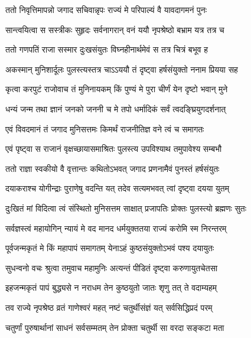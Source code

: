 \twolineshloka
{ततो निवृत्तिमापन्नो जगाद सचिवान्नृपः}
{राज्यं मे परिपाल्यं वै यावदागमनं पुनः} %

\twolineshloka
{सान्त्वयित्वा स सस्त्रीकः सुहृदः सर्वनागरान्}
{वनं ययौ नृपश्रेष्ठो बभ्राम यत्र तत्र च} %

\twolineshloka
{ततो गणपतिं राजा सस्मार दुःखसंयुतः}
{विघ्नहीनार्थमेवं स तत्र चित्रं बभूव ह} %

\twolineshloka
{अकस्मान् मुनिशार्दूलः पुलस्त्यस्तत्र चाऽऽययौ}
{तं दृष्ट्वा हर्षसंयुक्तो ननाम प्रियया सह} %

\twolineshloka
{कृत्वा करपुटं राजोवाच तं मुनिनायकम्}
{किं पुण्यं मे पुरा चीर्णं येन दृष्टो भवान् मुने} %

\twolineshloka
{धन्यं जन्म तथा ज्ञानं जनको जननी च मे}
{तपो धर्मादिकं सर्वं त्वदङ्घ्रियुगदर्शनात्} %

\twolineshloka
{एवं विवदमानं तं जगाद मुनिसत्तमः}
{किमर्थं राजनीतिज्ञ वने त्वं च समागतः} %

\twolineshloka
{एवं पृष्ट्वा स राजानं वृक्षच्छायासमाश्रितः}
{पुलस्त्य उपविश्याथ तमुपावेश्य सम्बभौ} %

\twolineshloka
{ततो राज्ञा स्वकीयो वै वृत्तान्तः कथितोऽभवत्}
{जगाद प्रणनामैवं पुनस्तं हर्षसंयुतः} %


\twolineshloka
{दयाकराश्च योगीन्द्राः पुराणेषु वदन्ति यत्}
{तदेव सत्यमभवत् त्वां दृष्ट्वा दयया युतम्} %

\twolineshloka
{दुःखितं मां विदित्वा त्वं संस्थितो मुनिसत्तम}
{साक्षात् प्रजापतिः प्रोक्तः पुलस्त्यो ब्रह्मणः सुतः} %

\twolineshloka
{सर्वज्ञस्त्वं महायोगिन् न्यायं मे वद मानद}
{धर्मयुक्ततया राज्यं करोमि स्म निरन्तरम्} %

\twolineshloka
{पूर्वजन्मकृतं मे किं महापापं समागतम्}
{येनाऽहं कुष्ठसंयुक्तोऽभवं पश्य दयायुतः} %


\twolineshloka
{सुधन्वनो वचः श्रुत्वा तमुवाच महामुनिः}
{अत्यन्तं पीडितं दृष्ट्वा करुणायुतचेतसा} %


\twolineshloka
{इहजन्मकृतं पापं बुद्ध्यसे न नराधम}
{तेन कुष्ठयुतो जातः श‍ृणु तत् ते वदाम्यहम्} %

\twolineshloka
{तव राज्ये नृपश्रेष्ठ व्रतं गाणेश्वरं महत्}
{नष्टं चतुर्थीसंज्ञं यत् सर्वसिद्धिप्रदं परम्} %

\twolineshloka
{चतुर्णां पुरुषार्थानां साधनं सर्वसम्मतम्}
{तेन प्रोक्ता चतुर्थी सा वरदा सङ्कटा मता} %

